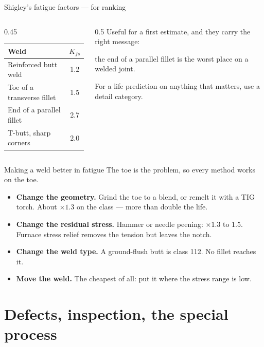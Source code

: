 \documentclass[aspectratio=169,10pt]{beamer}
\begin{document}
\begin{frame}{Shigley's fatigue factors --- for ranking}
\begin{columns}[c]
\begin{column}{0.45\textwidth}
\centering
\begin{tabular}{@{}lc@{}}
\toprule
\textbf{Weld} & $K_{fs}$\\
\midrule
Reinforced butt weld & 1.2\\
Toe of a transverse fillet & 1.5\\
End of a parallel fillet & \alert{2.7}\\
T-butt, sharp corners & 2.0\\
\bottomrule
\end{tabular}

\end{column}
\begin{column}{0.5\textwidth}
Useful for a first estimate, and they carry the right message:

\medskip
the \alert{end of a parallel fillet} is the worst place on a welded joint.

\medskip
For a life prediction on anything that matters, use a detail category.
\end{column}
\end{columns}
\end{frame}

\begin{frame}{Making a weld better in fatigue}
The toe is the problem, so every method works on the toe.
\begin{itemize}
  \item \textbf{Change the geometry.} Grind the toe to a blend, or remelt it with a TIG torch.
        About $\times1.3$ on the class --- more than double the life.
  \item \textbf{Change the residual stress.} Hammer or needle peening: $\times1.3$ to $1.5$.
        Furnace stress relief removes the tension but leaves the notch.
  \item \textbf{Change the weld type.} A ground-flush butt is class 112. No fillet reaches it.
  \item \textbf{Move the weld.} \alert{The cheapest of all}: put it where the stress range is low.
\end{itemize}
\end{frame}

\section{Defects, inspection, the special process}
\end{document}
